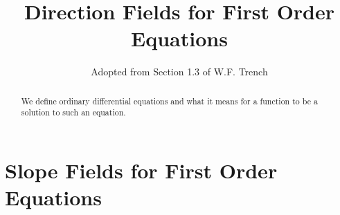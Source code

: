\documentclass{ximera}
\title{Direction Fields for First Order Equations}
\author{Adopted from Section 1.3 of W.F. Trench}
\begin{document}
\begin{abstract}
We define ordinary differential equations and what it means for a function to be a solution to such an equation.
\end{abstract}

\maketitle

\section*{Slope Fields for First Order Equations}


  
\end{document}
